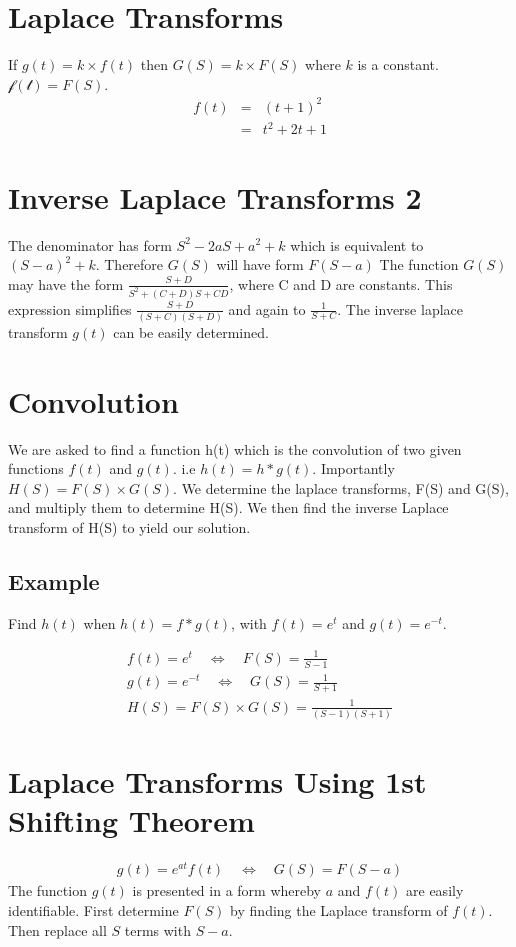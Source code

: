 \documentclass[12pt, a4paper]{article}
\begin{document}
\section{Laplace Transforms }
If $g(t)=k \times f(t)$ then $G(S) = k \times F(S)$ where $k$ is a
constant. $\mathcal{f(t)}=F(S)$.
\begin{eqnarray}
f(t) &=& (t+1)^2\\
&=& t^2 +2t +1 \nonumber
\end{eqnarray}

\section{Inverse Laplace Transforms 2}

The denominator has form $S^2 - 2aS + a^2 + k$ which is equivalent
to $(S-a)^2 + k$. Therefore $G(S)$ will have form $F(S-a)$
\newline
The function $G(S)$ may have the form $\frac{S+D}{S^2 +(C+D)S +
CD}$, where C and D are constants. This expression simplifies
$\frac{S+D}{(S+C)(S+D)}$ and again to $\frac{1}{S+C}$. The inverse
laplace transform $g(t)$ can be easily determined.
\section{Convolution}
We are asked to find a function h(t) which is the convolution of
two given functions $f(t)$ and $g(t)$. i.e $h(t)=h*g(t)$.\newline
Importantly $H(S) = F(S)\times G(S)$. We determine the laplace
transforms, F(S) and G(S), and multiply them to determine H(S). We
then find the inverse Laplace transform of H(S) to yield our
solution.
\subsection{Example}
Find $h(t)$ when $h(t) = f*g(t)$, with $f(t)= e^{t}$ and $g(t)=
e^{-t}$.\newline

\begin{eqnarray}
f(t) = e^{t} \quad \Leftrightarrow \quad F(S)= \frac{1}{S-1}
 \nonumber\\
g(t) = e^{-t} \quad \Leftrightarrow \quad G(S)= \frac{1}{S+1}
 \nonumber\\
H(S) = F(S)\times G(S) = \frac{1}{(S-1)(S+1)}
 \nonumber
\end{eqnarray}

\section{Laplace Transforms Using 1st Shifting Theorem}
\begin{eqnarray}
 g(t) = e^{at}f(t) \quad \Leftrightarrow \quad G(S)= F(S-a) \nonumber
\end{eqnarray}
The function $g(t)$ is presented in a form whereby $a$ and $f(t)$
are easily identifiable. First determine $F(S)$ by finding the
Laplace transform of $f(t)$. Then replace all $S$ terms with
$S-a$.
\end{document}
